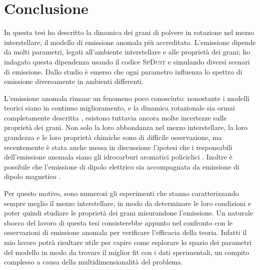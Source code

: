\chapter{Conclusione}

In questa tesi ho descritto la dinamica dei grani di polvere in rotazione nel mezzo interstellare, il modello di emissione anomala più accreditato. L'emissione dipende da molti parametri, legati all'ambiente interstellare e alle proprietà dei grani; ho indagato questa dipendenza usando il codice \textsc{SpDust} e simulando diversi scenari di emissione. Dallo studio è emerso che ogni parametro influenza lo spettro di emissione diversamente in ambienti differenti.

L'emissione anomala rimane un fenomeno poco conosciuto: nonostante i modelli teorici siano in continuo miglioramento, e la dinamica rotazionale sia ormai completamente descritta \parencite[20]{Ali2}, esistono tuttavia ancora molte incertezze sulle proprietà dei grani. Non solo la loro abbondanza nel mezzo interstellare, la loro grandezza e le loro proprietà chimiche sono di difficile osservazione, ma recentemente è stata anche messa in discussione l'ipotesi che i responsabili dell'emissione anomala siano gli idrocarburi aromatici policiclici \parencite{Hensley2}. Inoltre è possibile che l'emissione di dipolo elettrico sia accompagnata da emissione di dipolo magnetico \parencite{magnetic}.

Per questo motivo, sono numerosi gli esperimenti che stanno caratterizzando sempre meglio il mezzo interstellare, in modo da determinare le loro condizioni e poter quindi studiare le proprietà dei grani misurandone l'emissione.
Un naturale sbocco del lavoro di questa tesi consisterebbe appunto nel confronto con le osservazioni di emissione anomala per verificare l'efficacia della teoria. Infatti il mio lavoro potrà risultare utile per capire come esplorare lo spazio dei parametri del modello in modo da trovare il miglior fit con i dati sperimentali, un compito complesso a causa della multidimensionalità del problema.